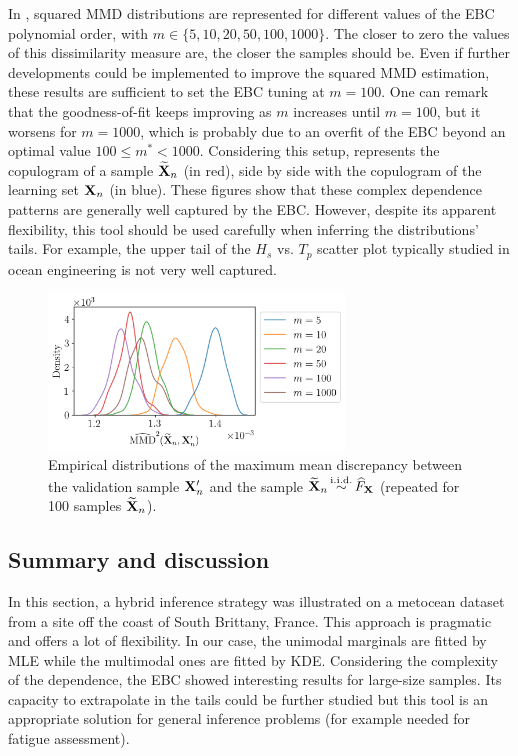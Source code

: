 In , squared MMD distributions are represented for different values of the EBC polynomial order, with $m\in\{5, 10, 20, 50, 100, 1000\}$. 
The closer to zero the values of this dissimilarity measure are, the closer the samples should be. 
Even if further developments could be implemented to improve the squared MMD estimation, these results are sufficient to set the EBC tuning at $m=100$. 
One can remark that the goodness-of-fit keeps improving as $m$ increases until $m=100$, but it worsens for $m=1000$, which is probably due to an overfit of the EBC beyond an optimal value $100 \leq m^* < 1000$. 
Considering this setup,  represents the copulogram of a sample $\widetilde{{\bf X}}_n$ (in red), side by side with the copulogram of the learning set ${\bf X}_n$ (in blue). 
These figures show that these complex dependence patterns are generally well captured by the EBC. 
However, despite its apparent flexibility, this tool should be used carefully when inferring the distributions' tails. 
For example, the upper tail of the $H_s$ vs. $T_p$ scatter plot typically studied in ocean engineering is not very well captured.

\begin{figure}
    \centering
    \includegraphics[width=0.7\textwidth]{../numerical_experiments/chapter3/figures/SB_MMD_goodness.png}
    \caption{Empirical distributions of the maximum mean discrepancy between the validation sample ${\bf X}_n'$ and the sample $\widetilde{{\bf X}}_n \mathop{\sim}\limits^{\mathrm{i.i.d.}} \widehat{F}_{\bf X}$ (repeated for 100 samples $\widetilde{{\bf X}}_n$).}
    \label{fig:sb_ebc_mmd}
\end{figure}


\subsection{Summary and discussion}
In this section, a hybrid inference strategy was illustrated on a metocean dataset from a site off the coast of South Brittany, France. 
This approach is pragmatic and offers a lot of flexibility. 
In our case, the unimodal marginals are fitted by MLE while the multimodal ones are fitted by KDE. 
Considering the complexity of the dependence, the EBC showed interesting results for large-size samples. 
Its capacity to extrapolate in the tails could be further studied \citep{heredia_2022_nonparam_copula} but this tool is an appropriate solution for general inference problems (for example needed for fatigue assessment). 

